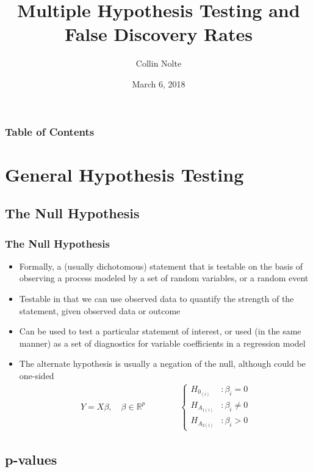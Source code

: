 \documentclass[11pt]{beamer}
\author{Collin Nolte}
\title[FDR]{Multiple Hypothesis Testing and False Discovery Rates}
\date{March 6, 2018}
\begin{document}
\begin{frame}
\titlepage
\end{frame}

\begin{frame}
\frametitle{Table of Contents}
\tableofcontents
\end{frame}

\section{General Hypothesis Testing}
\subsection{The Null Hypothesis}



\begin{frame}
\frametitle{The Null Hypothesis}
{

\begin{itemize}
\item Formally, a (usually dichotomous) statement that is testable on the basis of observing a process modeled by a set of random variables, or a random event \\
\item Testable in that we can use observed data to quantify the strength of the statement, given observed data or outcome \\
\item Can be used to test a particular statement of interest, or used (in the same manner) as a set of diagnostics for variable coefficients in a  regression model 

\item The alternate hypothesis is usually a negation of the null, although could be one-sided
\begin{align*}
Y = X \beta, \quad \beta \in \mathbb{R}^p \qquad \qquad 	\begin{cases}
H_{0_{(i)}}&: \beta_i = 0 \\
H_{A_{1(i)}}&: \beta_i \not= 0 \\
H_{A_{2(i)}}&: \beta_i > 0
\end{cases}
\end{align*}
\end{itemize}
}
\end{frame}

\subsection{p-values}
\end{document}
